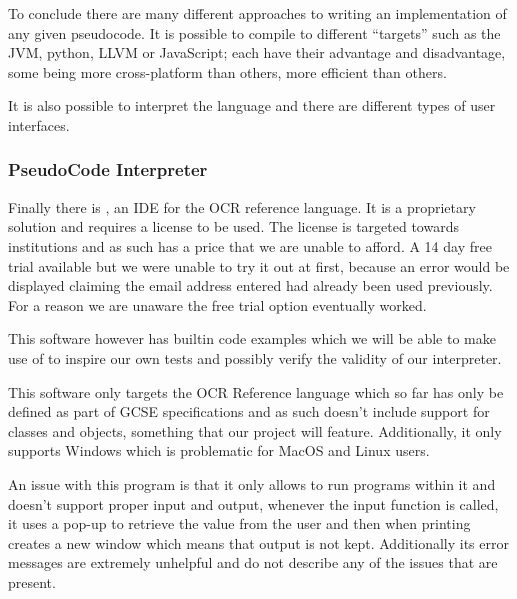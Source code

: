 \documentclass{article}
\begin{document}
To conclude there are many different approaches to writing an implementation of
any given pseudocode. It is possible to compile to different ``targets'' such
as the JVM, python, LLVM or JavaScript; each have their advantage and
disadvantage, some being more cross-platform than others, more efficient than
others.

It is also possible to interpret the language and there are different types of
user interfaces.

\subsubsection{PseudoCode Interpreter}

Finally there is , an IDE for the OCR reference
language. It is a proprietary solution and requires a license to be used. The
license is targeted towards institutions and as such has a price that we are
unable to afford. A 14 day free trial available but we were unable to try it
out at first, because an error would be displayed claiming the email address
entered had already been used previously. For a reason we are unaware the free
trial option eventually worked.

This software however has builtin code examples which we will be able to make
use of to inspire our own tests and possibly verify the validity of our
interpreter.

This software only targets the OCR Reference language which so far has only be
defined as part of GCSE specifications and as such doesn't include support for
classes and objects, something that our project will feature. Additionally, it
only supports Windows which is problematic for MacOS and Linux users.

An issue with this program is that it only allows to run programs within it and
doesn't support proper input and output, whenever the input function is called,
it uses a pop-up to retrieve the value from the user and then when printing
creates a new window which means that output is not kept. Additionally its
error messages are extremely unhelpful and do not describe any of the issues
that are present.
\end{document}
